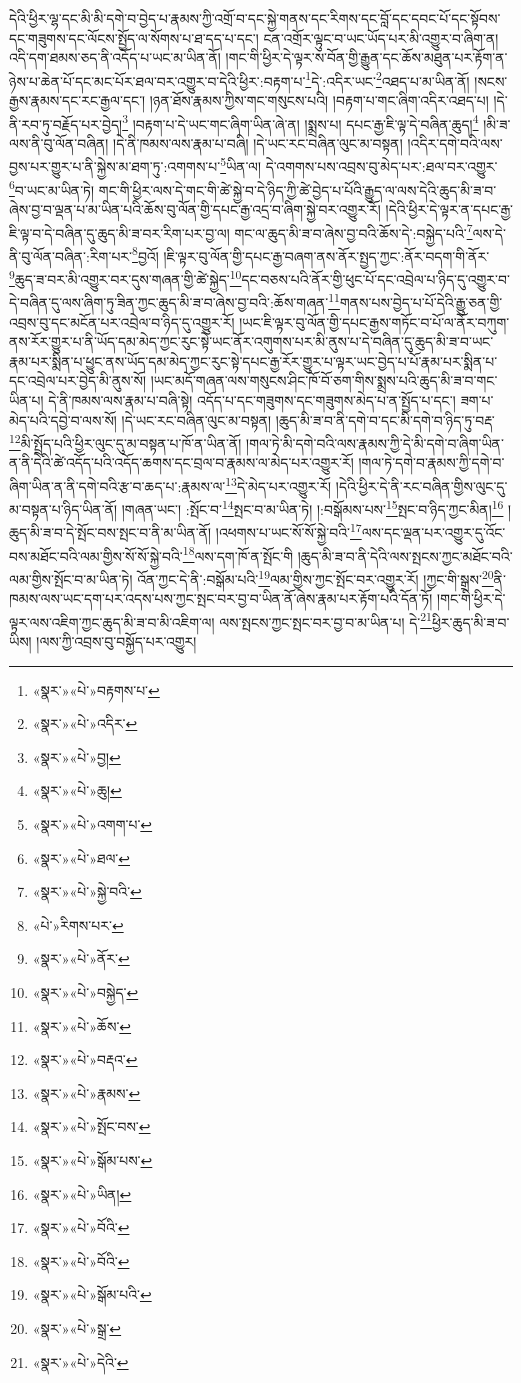 དེའི་ཕྱིར་ལྷ་དང་མི་མི་དགེ་བ་བྱེད་པ་རྣམས་ཀྱི་འགྲོ་བ་དང་སྐྱེ་གནས་དང་རིགས་དང་བློ་དང་དབང་པོ་དང་སྟོབས་དང་གཟུགས་དང་ལོངས་སྤྱོད་ལ་སོགས་པ་ཐ་དད་པ་དང་། ངན་འགྲོར་ལྟུང་བ་ཡང་ཡོད་པར་མི་འགྱུར་བ་ཞིག་ན། འདི་དག་ཐམས་ཅད་ནི་འདོད་པ་ཡང་མ་ཡིན་ནོ། །གང་གི་ཕྱིར་དེ་ལྟར་ས་བོན་གྱི་རྒྱུན་དང་ཆོས་མཐུན་པར་རྟོག་ན་ཉེས་པ་ཆེན་པོ་དང་མང་པོར་ཐལ་བར་འགྱུར་བ་དེའི་ཕྱིར་:བརྟག་པ་\footnote{«སྣར་»«པེ་»བརྟགས་པ་}དེ་:འདིར་ཡང་\footnote{«སྣར་»«པེ་»འདིར་}འཐད་པ་མ་ཡིན་ནོ། །སངས་རྒྱས་རྣམས་དང་རང་རྒྱལ་དང་། །ཉན་ཐོས་རྣམས་ཀྱིས་གང་གསུངས་པའི། །བརྟག་པ་གང་ཞིག་འདིར་འཐད་པ། །དེ་ནི་རབ་ཏུ་བརྗོད་པར་བྱེད།\footnote{«སྣར་»«པེ་»བྱ།} །བརྟག་པ་དེ་ཡང་གང་ཞིག་ཡིན་ཞེ་ན། །སྨྲས་པ། དཔང་རྒྱ་ཇི་ལྟ་དེ་བཞིན་ཆུད།\footnote{«སྣར་»«པེ་»ཆུ།} །མི་ཟ་ལས་ནི་བུ་ལོན་བཞིན། །དེ་ནི་ཁམས་ལས་རྣམ་པ་བཞི། །དེ་ཡང་རང་བཞིན་ལུང་མ་བསྟན། །འདིར་དགེ་བའི་ལས་བྱས་པར་གྱུར་པ་ནི་སྐྱེས་མ་ཐག་ཏུ་:འགགས་པ་\footnote{«སྣར་»«པེ་»འགག་པ་}ཡིན་ལ། དེ་འགགས་པས་འབྲས་བུ་མེད་པར་:ཐལ་བར་འགྱུར་\footnote{«སྣར་»«པེ་»ཐལ་}བ་ཡང་མ་ཡིན་ཏེ། གང་གི་ཕྱིར་ལས་དེ་གང་གི་ཚེ་སྐྱེ་བ་དེ་ཉིད་ཀྱི་ཚེ་བྱེད་པ་པོའི་རྒྱུད་ལ་ལས་དེའི་ཆུད་མི་ཟ་བ་ཞེས་བྱ་བ་ལྡན་པ་མ་ཡིན་པའི་ཆོས་བུ་ལོན་གྱི་དཔང་རྒྱ་འདྲ་བ་ཞིག་སྐྱེ་བར་འགྱུར་རོ། །དེའི་ཕྱིར་དེ་ལྟར་ན་དཔང་རྒྱ་ཇི་ལྟ་བ་དེ་བཞིན་དུ་ཆུད་མི་ཟ་བར་རིག་པར་བྱ་ལ། གང་ལ་ཆུད་མི་ཟ་བ་ཞེས་བྱ་བའི་ཆོས་དེ་:བསྐྱེད་པའི་\footnote{«སྣར་»«པེ་»སྐྱེ་བའི་}ལས་དེ་ནི་བུ་ལོན་བཞིན་:རིག་པར་\footnote{«པེ་»རིགས་པར་}བྱའོ། །ཇི་ལྟར་བུ་ལོན་གྱི་དཔང་རྒྱ་བཞག་ནས་ནོར་སྤྱད་ཀྱང་:ནོར་བདག་གི་ནོར་\footnote{«སྣར་»«པེ་»ནོར་}ཆུད་ཟ་བར་མི་འགྱུར་བར་དུས་གཞན་གྱི་ཚེ་སྐྱེད་\footnote{«སྣར་»«པེ་»བསྐྱེད་}དང་བཅས་པའི་ནོར་གྱི་ཕུང་པོ་དང་འབྲེལ་པ་ཉིད་དུ་འགྱུར་བ་དེ་བཞིན་དུ་ལས་ཞིག་ཏུ་ཟིན་ཀྱང་ཆུད་མི་ཟ་བ་ཞེས་བྱ་བའི་:ཆོས་གཞན་\footnote{«སྣར་»«པེ་»ཆོས་}གནས་པས་བྱེད་པ་པོ་དེའི་རྒྱུ་ཅན་གྱི་འབྲས་བུ་དང་མངོན་པར་འབྲེལ་བ་ཉིད་དུ་འགྱུར་རོ། །ཡང་ཇི་ལྟར་བུ་ལོན་གྱི་དཔང་རྒྱས་གཏོང་བ་པོ་ལ་ནོར་བཀུག་ནས་རོར་གྱུར་པ་ནི་ཡོད་དམ་མེད་ཀྱང་རུང་སྟེ་ཡང་ནོར་འགུགས་པར་མི་ནུས་པ་དེ་བཞིན་དུ་ཆུད་མི་ཟ་བ་ཡང་རྣམ་པར་སྨིན་པ་ཕྱུང་ནས་ཡོད་དམ་མེད་ཀྱང་རུང་སྟེ་དཔང་རྒྱ་རོར་གྱུར་པ་ལྟར་ཡང་བྱེད་པ་པོ་རྣམ་པར་སྨིན་པ་དང་འབྲེལ་པར་བྱེད་མི་ནུས་སོ། །ཡང་མདོ་གཞན་ལས་གསུངས་ཤིང་ཁོ་བོ་ཅག་གིས་སྨྲས་པའི་ཆུད་མི་ཟ་བ་གང་ཡིན་པ། དེ་ནི་ཁམས་ལས་རྣམ་པ་བཞི་སྟེ། འདོད་པ་དང་གཟུགས་དང་གཟུགས་མེད་པ་ན་སྤྱོད་པ་དང་། ཟག་པ་མེད་པའི་དབྱེ་བ་ལས་སོ། །དེ་ཡང་རང་བཞིན་ལུང་མ་བསྟན། །ཆུད་མི་ཟ་བ་ནི་དགེ་བ་དང་མི་དགེ་བ་ཉིད་ཏུ་བརྡ་\footnote{«སྣར་»«པེ་»བརྡའ་}མི་སྤྲོད་པའི་ཕྱིར་ལུང་དུ་མ་བསྟན་པ་ཁོ་ན་ཡིན་ནོ། །གལ་ཏེ་མི་དགེ་བའི་ལས་རྣམས་ཀྱི་དེ་མི་དགེ་བ་ཞིག་ཡིན་ན་ནི་དེའི་ཚེ་འདོད་པའི་འདོད་ཆགས་དང་བྲལ་བ་རྣམས་ལ་མེད་པར་འགྱུར་རོ། །གལ་ཏེ་དགེ་བ་རྣམས་ཀྱི་དགེ་བ་ཞིག་ཡིན་ན་ནི་དགེ་བའི་རྩ་བ་ཆད་པ་:རྣམས་ལ་\footnote{«སྣར་»«པེ་»རྣམས་}དེ་མེད་པར་འགྱུར་རོ། །དེའི་ཕྱིར་དེ་ནི་རང་བཞིན་གྱིས་ལུང་དུ་མ་བསྟན་པ་ཉིད་ཡིན་ནོ། །གཞན་ཡང་། :སྤོང་བ་\footnote{«སྣར་»«པེ་»སྤོང་བས་}སྤང་བ་མ་ཡིན་ཏེ། །:བསྒོམས་པས་\footnote{«སྣར་»«པེ་»སྒོམ་པས་}སྤང་བ་ཉིད་ཀྱང་མིན།\footnote{«སྣར་»«པེ་»ཡིན།} །ཆུད་མི་ཟ་བ་དེ་སྤོང་བས་སྤང་བ་ནི་མ་ཡིན་ནོ། །འཕགས་པ་ཡང་སོ་སོ་སྐྱེ་བའི་\footnote{«སྣར་»«པེ་»བོའི་}ལས་དང་ལྡན་པར་འགྱུར་དུ་འོང་བས་མཐོང་བའི་ལམ་གྱིས་སོ་སོ་སྐྱེ་བའི་\footnote{«སྣར་»«པེ་»བོའི་}ལས་དག་ཁོ་ན་སྤོང་གི །ཆུད་མི་ཟ་བ་ནི་དེའི་ལས་སྤངས་ཀྱང་མཐོང་བའི་ལམ་གྱིས་སྤོང་བ་མ་ཡིན་ཏེ། འོན་ཀྱང་དེ་ནི་:བསྒོམ་པའི་\footnote{«སྣར་»«པེ་»སྒོམ་པའི་}ལམ་གྱིས་ཀྱང་སྤོང་བར་འགྱུར་རོ། །ཀྱང་གི་སྒྲས་\footnote{«སྣར་»«པེ་»སྒྲ་}ནི་ཁམས་ལས་ཡང་དག་པར་འདས་པས་ཀྱང་སྤང་བར་བྱ་བ་ཡིན་ནོ་ཞེས་རྣམ་པར་རྟོག་པའི་དོན་ཏོ། །གང་གི་ཕྱིར་དེ་ལྟར་ལས་འཇིག་ཀྱང་ཆུད་མི་ཟ་བ་མི་འཇིག་ལ། ལས་སྤངས་ཀྱང་སྤང་བར་བྱ་བ་མ་ཡིན་པ། དེ་\footnote{«སྣར་»«པེ་»དེའི་}ཕྱིར་ཆུད་མི་ཟ་བ་ཡིས། །ལས་ཀྱི་འབྲས་བུ་བསྐྱོད་པར་འགྱུར། 